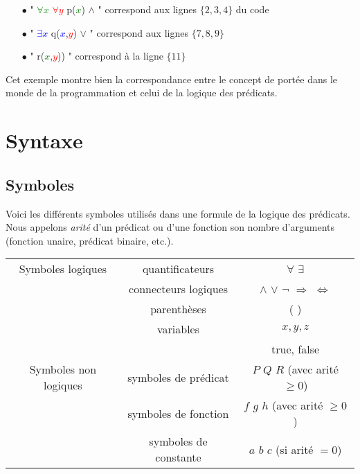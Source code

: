 \begin{itemize}

\item[$\bullet$] " \textcolor{Green}{$\forall x$} \textcolor{Red}{$\forall y$} p(\textcolor{Green}{$x$}) $\wedge$ " correspond aux lignes $\lbrace 2,3,4 \rbrace$ du code \\

\item[$\bullet$]" \textcolor{Blue}{$\exists x$}  q(\textcolor{Blue}{$x$},\textcolor{Red}{$y$}) $\vee$ " correspond aux lignes $\lbrace 7,8,9 \rbrace$ \\
 
\item[$\bullet$]" r(\textcolor{Green}{$x$},\textcolor{Red}{$y$})) "  correspond à la ligne $\lbrace 11 \rbrace$ \\

\end{itemize}

Cet exemple montre bien la correspondance entre le concept de portée
dans le monde de la programmation et celui de la logique des prédicats.

\section{Syntaxe}

\subsection{Symboles}

Voici les différents symboles utilisés dans une formule de la logique des prédicats.
Nous appelons {\em arité} d'un prédicat ou d'une fonction son nombre d'arguments
(fonction unaire, prédicat binaire, etc.).

\begin{tabular}{|c|c|c|}
	\hline
	Symboles logiques & quantificateurs & $\forall$ $\exists$ \\
	                  & connecteurs logiques & $\wedge$ $\vee$ $\neg$ $\Rightarrow$ $\Leftrightarrow$ \\
	                  & parenthèses & ( ) \\
	                  & variables & $x, y, z$ \\
	                  & & true, false\\
	\hline
	Symboles non logiques & symboles de prédicat & $P$ $Q$ $R$ (avec arité $\geq 0$) \\
	   		      & symboles de fonction & $f$ $g$ $h$ (avec arité $\geq 0$) \\
	   		      & symboles de constante & $a$ $b$ $c$ (si arité $= 0$) \\
	\hline
\end{tabular}

